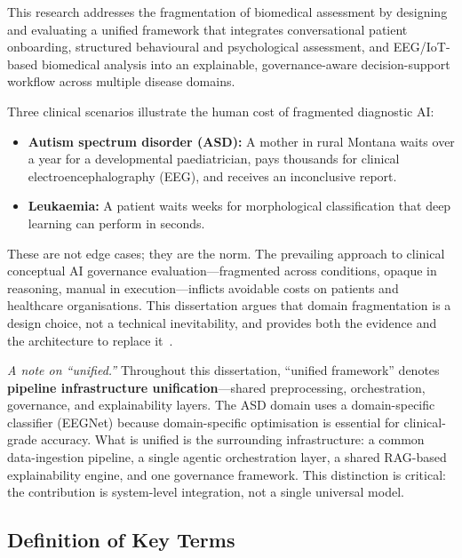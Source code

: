 \medskip
\noindent
This research addresses the fragmentation of biomedical assessment by designing and evaluating a unified framework that integrates conversational patient onboarding, structured behavioural and psychological assessment, and EEG/IoT-based biomedical analysis into an explainable, governance-aware decision-support workflow across multiple disease domains.

Three clinical scenarios illustrate the human cost of fragmented diagnostic AI:

\begin{itemize}[leftmargin=*, itemsep=3pt]
    \item \textbf{Autism spectrum disorder (ASD):} A mother in rural Montana waits over a year for a developmental paediatrician, pays thousands for clinical electroencephalography (EEG), and receives an inconclusive report.
    \item \textbf{Leukaemia:} A patient waits weeks for morphological classification that deep learning can perform in seconds.
\end{itemize}


\noindent These are not edge cases; they are the norm. The prevailing approach to clinical conceptual AI governance evaluation---fragmented across conditions, opaque in reasoning, manual in execution---inflicts avoidable costs on patients and healthcare organisations. This dissertation argues that domain fragmentation is a design choice, not a technical inevitability, and provides both the evidence and the architecture to replace it~\cite{esteva2019guide, topol2019deep}.

\textit{A note on ``unified.''} Throughout this dissertation, ``unified framework'' denotes \textbf{pipeline infrastructure unification}---shared preprocessing, orchestration, governance, and explainability layers. The ASD domain uses a domain-specific classifier (EEGNet) because domain-specific optimisation is essential for clinical-grade accuracy. What is unified is the surrounding infrastructure: a common data-ingestion pipeline, a single agentic orchestration layer, a shared RAG-based explainability engine, and one governance framework. This distinction is critical: the contribution is system-level integration, not a single universal model.

\subsection{Definition of Key Terms}
\label{sec:key_terms}

